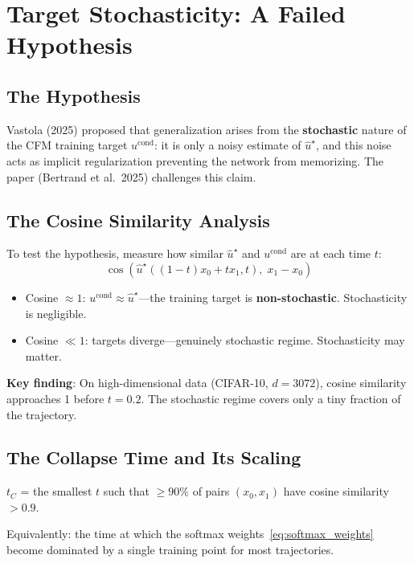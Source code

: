 \documentclass[11pt, a4paper]{article}
\theoremstyle{plain}
\theoremstyle{definition}
\theoremstyle{remark}
\begin{document}
\section{Target Stochasticity: A Failed Hypothesis}
\label{sec:stochasticity}

\subsection{The Hypothesis}

Vastola (2025) proposed that generalization arises from the \textbf{stochastic} nature of the CFM training target $u^{\mathrm{cond}}$: it is only a noisy estimate of $\hat{u}^\star$, and this noise acts as implicit regularization preventing the network from memorizing. The paper (Bertrand et al.\ 2025) challenges this claim.

\subsection{The Cosine Similarity Analysis}

To test the hypothesis, measure how similar $\hat{u}^\star$ and $u^{\mathrm{cond}}$ are at each time $t$:
\begin{equation}
  \cos\!\left(\hat{u}^\star((1-t)x_0 + tx_1, t),\; x_1 - x_0\right)
  \label{eq:cosine}
\end{equation}

\begin{itemize}
  \item Cosine $\approx 1$: $u^{\mathrm{cond}} \approx \hat{u}^\star$---the training target is \textbf{non-stochastic}. Stochasticity is negligible.
  \item Cosine $\ll 1$: targets diverge---genuinely stochastic regime. Stochasticity may matter.
\end{itemize}

\textbf{Key finding}: On high-dimensional data (CIFAR-10, $d=3072$), cosine similarity approaches 1 before $t=0.2$. The stochastic regime covers only a tiny fraction of the trajectory.

\subsection{The Collapse Time and Its Scaling}

\begin{defbox}
$t_C$ = the smallest $t$ such that $\geq 90\%$ of pairs $(x_0, x_1)$ have cosine similarity $> 0.9$.

Equivalently: the time at which the softmax weights~\eqref{eq:softmax_weights} become dominated by a single training point for most trajectories.
\end{defbox}
\end{document}
